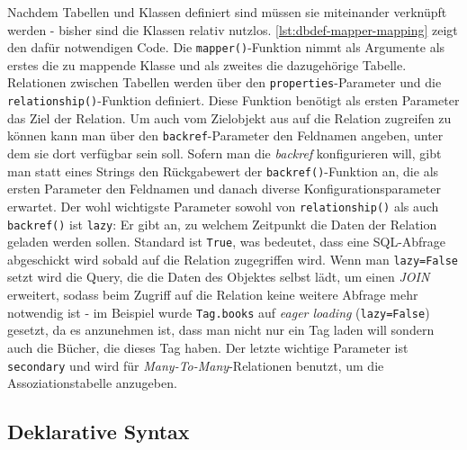 

Nachdem Tabellen und Klassen definiert sind müssen sie miteinander verknüpft
werden - bisher sind die Klassen relativ nutzlos.
\autoref{lst:dbdef-mapper-mapping} zeigt den dafür notwendigen Code. Die
\texttt{mapper()}-Funktion nimmt als Argumente als erstes die zu mappende Klasse
und als zweites die dazugehörige Tabelle. Relationen zwischen Tabellen werden
über den \texttt{properties}-Parameter und die \texttt{relationship()}-Funktion
definiert. Diese Funktion benötigt als ersten Parameter das Ziel der Relation.
Um auch vom Zielobjekt aus auf die Relation zugreifen zu können kann man über
den \texttt{backref}-Parameter den Feldnamen angeben, unter dem sie dort
verfügbar sein soll. Sofern man die \emph{backref} konfigurieren will, gibt
man statt eines Strings den Rückgabewert der \texttt{backref()}-Funktion an, die
als ersten Parameter den Feldnamen und danach diverse Konfigurationsparameter
erwartet. Der wohl wichtigste Parameter sowohl von \texttt{relationship()} als
auch \texttt{backref()} ist \texttt{lazy}: Er gibt an, zu welchem Zeitpunkt die
Daten der Relation geladen werden sollen. Standard ist \texttt{True}, was
bedeutet, dass eine SQL-Abfrage abgeschickt wird sobald auf die Relation
zugegriffen wird. Wenn man \texttt{lazy=False} setzt wird die Query, die die
Daten des Objektes selbst lädt, um einen \emph{JOIN} erweitert, sodass beim
Zugriff auf die Relation keine weitere Abfrage mehr notwendig ist - im Beispiel
wurde \texttt{Tag.books} auf \emph{eager loading} (\texttt{lazy=False}) gesetzt,
da es anzunehmen ist, dass man nicht nur ein Tag laden will sondern auch die
Bücher, die dieses Tag haben. Der letzte wichtige Parameter ist
\texttt{secondary} und wird für \emph{Many-To-Many}-Relationen benutzt, um die
Assoziationstabelle anzugeben.




\subsection{Deklarative Syntax}

